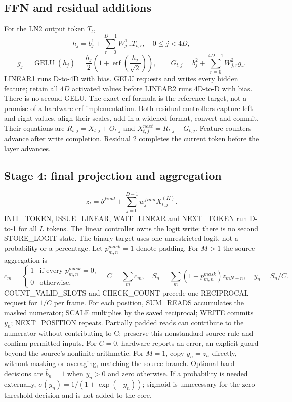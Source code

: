 \documentclass[11pt,a4paper]{article}
\begin{document}
\subsection{FFN and residual additions}
For the LN2 output token $T_t$,
\[
h_j=b^1_j+\sum_{r=0}^{D-1}W^1_{j,r}T_{t,r},\quad 0\leq j<4D,
\]
\[
g_j=\operatorname{GELU}(h_j)=\frac{h_j}{2}\left(1+\operatorname{erf}\left(\frac{h_j}{\sqrt 2}\right)\right),\qquad
G_{t,j}=b^2_j+\sum_{r=0}^{4D-1}W^2_{j,r}g_r.
\]
LINEAR1 runs D-to-4D with bias. GELU requests and writes every hidden feature; retain all $4D$ activated values before LINEAR2 runs 4D-to-D with bias. There is no second GELU. The exact-erf formula is the reference target, not a promise of a hardware erf implementation.
Both residual controllers capture left and right values, align their scales, add in a widened format, convert and commit. Their equations are $R_{t,j}=X_{t,j}+O_{t,j}$ and $X^{next}_{t,j}=R_{t,j}+G_{t,j}$. Feature counters advance after write completion. Residual 2 completes the current token before the layer advances.

\subsection{Stage 4: final projection and aggregation}
\[
z_t=b^{final}+\sum_{j=0}^{D-1}w^{final}_j X^{(K)}_{t,j}.
\]
INIT\_TOKEN, ISSUE\_LINEAR, WAIT\_LINEAR and NEXT\_TOKEN run D-to-1 for all $L$ tokens. The linear controller owns the logit write: there is no second STORE\_LOGIT state. The binary target uses one unrestricted logit, not a probability or a percentage.
Let $p^{mask}_{m,n}=1$ denote padding. For $M>1$ the source aggregation is
\[
c_m=\begin{cases}1&\text{if every }p^{mask}_{m,n}=0,\\0&\text{otherwise},\end{cases}
\quad C=\sum_m c_m,\quad S_n=\sum_m(1-p^{mask}_{m,n})z_{mN+n},\quad y_n=S_n/C.
\]
COUNT\_VALID\_SLOTS and CHECK\_COUNT precede one RECIPROCAL request for $1/C$ per frame. For each position, SUM\_READS accumulates the masked numerator; SCALE multiplies by the saved reciprocal; WRITE commits $y_n$; NEXT\_POSITION repeats. Partially padded reads can contribute to the numerator without contributing to C: preserve this nonstandard source rule and confirm permitted inputs. For $C=0$, hardware reports an error, an explicit guard beyond the source's nonfinite arithmetic.
For $M=1$, copy $y_n=z_n$ directly, without masking or averaging, matching the source branch. Optional hard decisions are $\hat b_n=1$ when $y_n>0$ and zero otherwise. If a probability is needed externally, $\sigma(y_n)=1/(1+\exp(-y_n))$; sigmoid is unnecessary for the zero-threshold decision and is not added to the core.
\end{document}
